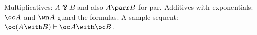 \documentclass{article}
\begin{document}
Multiplicatives: $A \invamp B$ and also $A \parr B$ for par.
Additives with exponentials: $\oc A$ and $\wn A$ guard the formulas.
A sample sequent: $\oc(A \with B) \vdash \oc A \with \oc B$.
\end{document}
